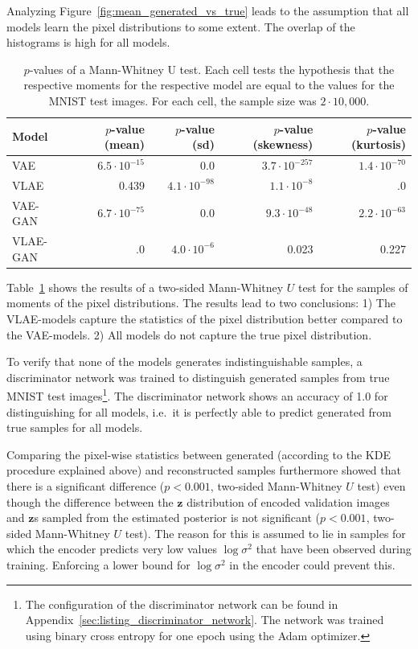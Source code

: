 Analyzing Figure~\ref{fig:mean_generated_vs_true} leads to the assumption that all models learn the pixel distributions to some extent.
The overlap of the histograms is high for all models.
\begin{table}
    \begin{tabular}{lrrrr}
        \toprule
        Model              & $p$-value (mean)    & $p$-value (sd)      & $p$-value (skewness) & $p$-value (kurtosis) \\
        \midrule
        \ac{VAE}           & $6.5\cdot 10^{-15}$ & 0.0                 & $3.7\cdot 10^{-257}$ & $1.4\cdot 10^{-70}$  \\
        \ac{VLAE}          & 0.439               & $4.1\cdot 10^{-98}$ & $1.1\cdot 10^{-8}$   & .0                   \\
        \ac{VAE}-\ac{GAN}  & $6.7\cdot 10^{-75}$ & 0.0                 & $9.3\cdot 10^{-48}$  & $2.2\cdot 10^{-63}$  \\
        \ac{VLAE}-\ac{GAN} & .0                  & $4.0\cdot 10^{-6}$  & 0.023                & 0.227                \\
        \bottomrule
    \end{tabular}
    \caption{$p$-values of a Mann-Whitney U test. Each cell tests the hypothesis that the respective moments for the respective model are equal to the values for the \textsc{MNIST} test images. For each cell, the sample size was $2\cdot 10,000$.}
    \label{tab:vae-vlae-mnist}
\end{table}
Table~\ref{tab:vae-vlae-mnist} shows the results of a two-sided Mann-Whitney $U$ test for the samples of moments of the pixel distributions.
The results lead to two conclusions: 1) The \ac{VLAE}-models capture the statistics of the pixel distribution better compared to the \ac{VAE}-models.
2) All models do not capture the true pixel distribution.

To verify that none of the models generates indistinguishable samples, a discriminator network was trained to distinguish generated samples from true \textsc{MNIST} test images\footnote{The configuration of the discriminator network can be found in Appendix~\ref{sec:listing_discriminator_network}. The network was trained using binary cross entropy for one epoch using the Adam optimizer.}.
The discriminator network shows an accuracy of 1.0 for distinguishing for all models, i.e.~it is perfectly able to predict generated from true samples for all models.

Comparing the pixel-wise statistics between generated (according to the \ac{KDE} procedure explained above) and reconstructed samples furthermore showed that there is a significant difference ($p < 0.001$, two-sided Mann-Whitney $U$ test) even though the difference between the $\bm{z}$ distribution of encoded validation images and $\bm{z}$s sampled from the estimated posterior is not significant ($p < 0.001$, two-sided Mann-Whitney $U$ test).
The reason for this is assumed to lie in samples for which the encoder predicts very low values $\log \sigma^2$ that have been observed during training.
Enforcing a lower bound for $\log \sigma^2$ in the encoder could prevent this.

